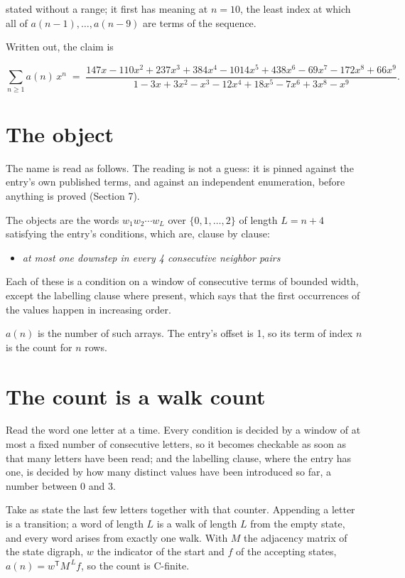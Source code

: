 \documentclass[11pt]{article}
\theoremstyle{definition}
\begin{document}
stated without a range; it first has meaning at $n = 10$, the least index at which all of $a(n-1),\dots,a(n-9)$ are terms of the sequence.

Written out, the claim is

\[\sum_{n \ge 1} a(n)\,x^n \;=\; \frac{147x - 110x^{2} + 237x^{3} + 384x^{4} - 1014x^{5} + 438x^{6} - 69x^{7} - 172x^{8} + 66x^{9}}{1 - 3x + 3x^{2} - x^{3} - 12x^{4} + 18x^{5} - 7x^{6} + 3x^{8} - x^{9}}.\]

\section{The object}

The name is read as follows. The reading is not a guess: it is pinned against the entry's own published terms, and against an independent enumeration, before anything is proved (Section 7).

The objects are the words $w_1 w_2 \cdots w_L$ over $\{0,1,\dots,2\}$ of length $L = n + 4$ satisfying the entry's conditions, which are, clause by clause:

\begin{itemize}

\item {\itshape at most one downstep in every 4 consecutive neighbor pairs}

\end{itemize}

Each of these is a condition on a window of consecutive terms of bounded width, except the labelling clause where present, which says that the first occurrences of the values happen in increasing order.

$a(n)$ is the number of such arrays. The entry's offset is 1, so its term of index $n$ is the count for $n$ rows.

\section{The count is a walk count}

Read the word one letter at a time. Every condition is decided by a window of at most a fixed number of consecutive letters, so it becomes checkable as soon as that many letters have been read; and the labelling clause, where the entry has one, is decided by how many distinct values have been introduced so far, a number between $0$ and 3.

Take as state the last few letters together with that counter. Appending a letter is a transition; a word of length $L$ is a walk of length $L$ from the empty state, and every word arises from exactly one walk. With $M$ the adjacency matrix of the state digraph, $w$ the indicator of the start and $f$ of the accepting states, $a(n) = w^{\mathsf T}M^{\,L}f$, so the count is C-finite.
\end{document}
